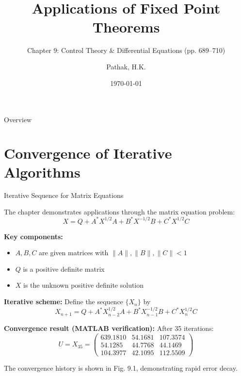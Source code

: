 \documentclass[aspectratio=169,10pt]{beamer}
\title{Applications of Fixed Point Theorems}
\subtitle{Chapter 9: Control Theory \& Differential Equations (pp. 689--710)}
\author{Pathak, H.K.}
\date{\today}
\institute{Nonlinear Analysis and Fixed Point Theory}
\begin{document}
\frame{\titlepage}

\begin{frame}{Overview}
  \tableofcontents
\end{frame}


\section{Convergence of Iterative Algorithms}

\begin{frame}[allowframebreaks]{Iterative Sequence for Matrix Equations}

The chapter demonstrates applications through the matrix equation problem:
\begin{equation}
X = Q + A^*X^{1/2}A + B^*X^{-1/2}B + C^*X^{1/2}C \tag{9.15}
\end{equation}

\textbf{Key components:}
\begin{itemize}
  \item $A, B, C$ are given matrices with $\|A\|, \|B\|, \|C\| < 1$
  \item $Q$ is a positive definite matrix
  \item $X$ is the unknown positive definite solution
\end{itemize}

\vspace{2em}

\textbf{Iterative scheme:} Define the sequence $\{X_n\}$ by
\begin{equation}
X_{n+1} = Q + A^*X_{n-2}^{1/2}A + B^*X_{n-1}^{-1/2}B + C^*X_n^{1/2}C \tag{9.16}
\end{equation}

\textbf{Convergence result (MATLAB verification):} After 35 iterations:
\begin{equation}
U = X_{35} = \begin{pmatrix}
  639.1810 & 54.1681 & 107.3574 \\
  54.1285 & 44.7768 & 44.1469 \\
  104.3977 & 42.1095 & 112.5509
\end{pmatrix}
\end{equation}

The convergence history is shown in Fig. 9.1, demonstrating rapid error decay.

\end{frame}
\end{document}
